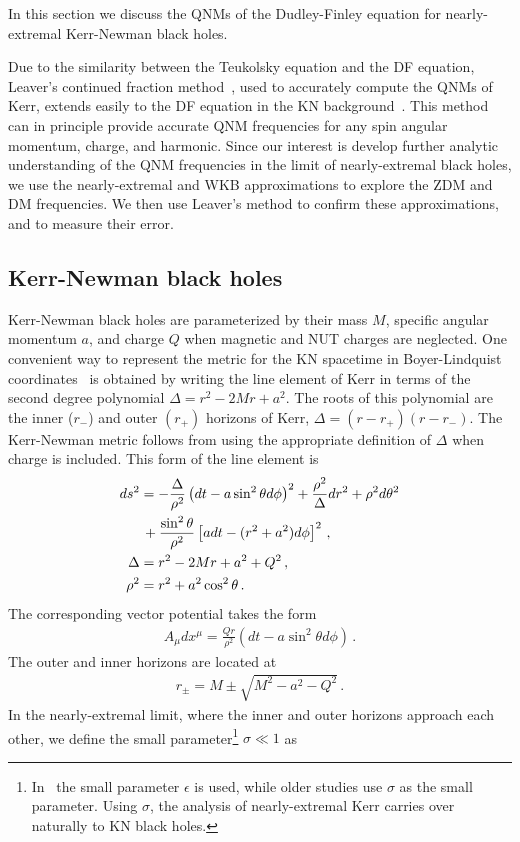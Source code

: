 \begin{refsection}
In this section we discuss the QNMs of the Dudley-Finley equation for  nearly-extremal Kerr-Newman black holes.

Due to the similarity between the Teukolsky equation and the DF equation, Leaver's continued fraction method~\cite{Leaver1986}, used to accurately compute the QNMs of Kerr, extends easily to the DF equation in the KN background~\cite{Berti:2005eb}.
This method can in principle provide accurate QNM frequencies for any spin angular momentum, charge, and harmonic.
Since our interest is develop further analytic understanding of the QNM frequencies in the limit of nearly-extremal black holes, we use the nearly-extremal and WKB approximations to explore the ZDM and DM frequencies. 
We then use Leaver's method to confirm these approximations, and to measure their error.


\subsection{Kerr-Newman black holes}

Kerr-Newman black holes are parameterized by their mass $M$, specific angular momentum $a$, and charge $Q$ when magnetic and NUT charges are neglected. One convenient way to represent the metric for the KN spacetime in Boyer-Lindquist coordinates~\cite{BoyerLindquist1967} is obtained by writing the line element of Kerr in terms of the second degree polynomial $\Delta = r^2 - 2 M r+a^2$. The roots of this polynomial are the inner ($r_-$) and outer $(r_+)$ horizons of Kerr, $\Delta = (r-r_+)(r-r_-)$. The Kerr-Newman metric follows from using the appropriate definition of $\Delta$ when charge is included. This form of the line element is~\cite{MTW}
\begin{align}
ds^2  &=  - \frac{\Delta}{\rho^2 } \left(dt - a \sin^2\theta d \phi \right)^2 + \frac{\rho^2}{\Delta} dr^2 + \rho^2 d\theta^2 \notag \\
& \, + \frac{\sin^2 \theta}{\rho^2} \left[a dt - (r^2+a^2)d\phi\right]^2
\,, \\
\Delta  &=  r^2 - 2 M r +a^2 +Q^2 \,, \\
\rho^2  &=  r^2 +a^2 \cos^2 \theta\,.
\end{align}
The corresponding vector potential takes the form 
\begin{align}
A_\mu dx^\mu =\frac{Qr}{\rho^2}\left(dt -a\sin^2\theta d\phi \right)\,.\end{align}
The outer and inner horizons are located at
\begin{align}
r_\pm =  M \pm \sqrt{M^2 - a^2 - Q^2} \,.
\end{align}
In the nearly-extremal limit, where the inner and outer horizons approach each other, we define the small 
parameter\footnote{In~\cite{Yang:2013uba} the small parameter $\epsilon$ is used, while older studies use $\sigma$ as the small parameter. 
Using $\sigma$, the analysis of nearly-extremal Kerr carries over naturally to KN black holes.}
$\sigma \ll1$ as


\end{refsection}
